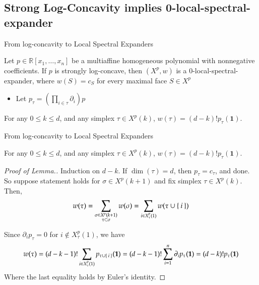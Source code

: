 \documentclass[10pt]{beamer}
\begin{document}
\subsection{Strong Log-Concavity implies 0-local-spectral-expander}
\begin{frame}{From log-concavity to Local Spectral Expanders}
\begin{theorem}[Proposition 4.1]
    \vspace{2pt}
    Let \( p \in \mathbb{R}[x_1, \ldots, x_n] \) be a multiaffine homogeneous polynomial with nonnegative coefficients. If \( p \) is strongly log-concave, then \( (X^p, w) \) is a \( 0 \)-local-spectral-expander, where \( w(S) = c_S \) for every maximal face \( S \in X^p \)
\end{theorem}

\begin{itemize}
    \item Let $p_\tau  = \left( \prod_{i \in \tau} \partial_i\right)p$
\end{itemize}
\begin{lemma}[4.2]
    For any $0 \leq k \leq d$, and any simplex $\tau \in X^p(k)$, $w(\tau) = (d-k)!p_\tau(\mathbf 1)$. 
\end{lemma}
\end{frame}

\begin{frame}{From log-concavity to Local Spectral Expanders}
    \footnotesize\begin{lemma}[Lemma  4.2]
        For any $0 \leq k \leq d$, and any simplex $\tau \in X^p(k)$, $w(\tau) = (d-k)!p_\tau(\mathbf 1)$. 
    \end{lemma}
    \begin{proof}[Proof of Lemma.]
    Induction on $d-k$. If $\dim(\tau) = d$, then $p_\tau = c_\tau$, and done. So suppose statement holds for $\sigma \in X^p(k+1)$ and fix simplex $\tau \in X^p(k)$. Then,
    \begin{align*}
        w(\tau) = \sum_{\substack{\sigma \in X^p(k+1) \\ \tau \subset \sigma}} w(\sigma) = \sum_{i \in X^p_\tau(1)} w(\tau \cup \Set{i})
    \end{align*}

    Since $\partial_i p_\tau = 0$ for $i \not \in X_\tau^p(1)$, we have
    \begin{align*}
        w(\tau) = (d-k-1)!\sum_{i \in X^p_\tau(1)} p_{\tau \cup \Set{i}}(\mathbf 1) = (d-k-1)!\sum_{i=1}^n \partial_i p_\tau(\mathbf 1) = (d-k)! p_\tau(\mathbf 1)
    \end{align*}
    Where the last equality holds by Euler's identity.
    \end{proof}
\end{frame}
\end{document}

